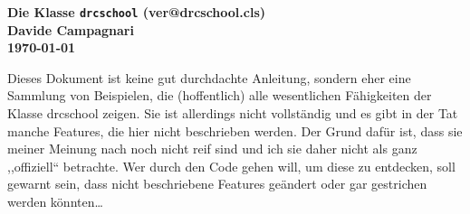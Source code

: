 \documentclass[hyperworksheet,pgfplots]{drcschool}
\date{30.\ Februar 1712}
\newcommand*{\pkg}[1]{\textup{\ttfamily#1}}                                %
\begin{document}
\begin{center}
\Large\bfseries Die Klasse \texttt{drcschool} (\csname ver@drcschool.cls\endcsname)\\
\normalfont\normalsize Davide Campagnari\\
\small\today
\end{center}
Dieses Dokument ist keine gut durchdachte Anleitung, sondern eher eine
Sammlung von Beispielen, die (hoffentlich) alle wesentlichen Fähigkeiten
der Klasse \pkg{drcschool} zeigen.
Sie ist allerdings nicht vollständig und es gibt in der Tat manche Features,
die hier nicht beschrieben werden. Der Grund dafür ist, dass sie meiner Meinung
nach noch nicht reif sind und ich sie daher nicht als ganz ,,offiziell``
betrachte. Wer durch den Code gehen will, um diese zu entdecken, soll gewarnt
sein, dass nicht beschriebene Features geändert oder gar gestrichen werden
könnten\ldots
\end{document}
